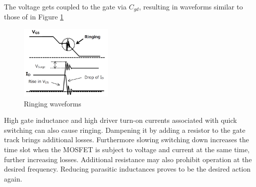 The voltage gets coupled to the gate via $C_{gd}$, resulting in waveforms similar to those of in Figure \ref{fig:ringing_wf}

\begin{figure}[H]
	\centering
	\includegraphics[width=0.4\textwidth]{pictures/theory/ringing_wf.PNG}
	\caption{Ringing waveforms}
	\label{fig:ringing_wf}
\end{figure}

High gate inductance and high driver turn-on currents associated with quick switching can also cause ringing. Dampening it by adding a resistor to the gate track brings additional losses. Furthermore slowing switching down increases the time slot when the MOSFET is subject to voltage and current at the same time, further increasing losses. Additional resistance may also prohibit operation at the desired frequency. Reducing parasitic inductances proves to be the desired action again.